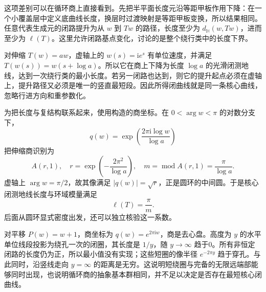 这项差别可以在循环商上直接看到。先把半平面长度元沿等距甲板作用下降：在一个小覆盖层中定义底曲线长度，换层时过渡映射是等距甲板变换，所以结果相同。任意代表生成元的闭路提升为从 \(w\) 到 \(Tw\) 的路径，长度至少为 \(d_{\mathbb H}(w,Tw)\)，进而至少为 \(\ell(T)\)。这里允许闭路基点变化，讨论的是整个绕行类中的长度下界。

\ProseParagraphBreak
对伸缩 \(T(w)=aw\)，虚轴上的 \(w(s)=\mathrm i e^s\) 有单位速度，并满足 \(T(w(s))=w(s+\log a)\)。所以它在商上下降为长度 \(\log a\) 的光滑闭测地线，达到一次绕行类的最小长度。若另一闭路也达到，则它的提升起点必须在虚轴上，提升路径又必须是唯一的竖直最短段。因此所得闭曲线就是同一条核心曲线，忽略行进方向和重参数化。

\ProseParagraphBreak
为把长度与复结构联系起来，使用构造的商坐标。在 \(0<\arg w<\pi\) 的对数分支下，
\[
 q(w)=\exp\left(\frac{2\pi\mathrm i\log w}{\log a}\right)
\]
把伸缩商识别为
\[
 A(r,1),\quad
 r=\exp\left(-\frac{2\pi^2}{\log a}\right),\quad
 m=\operatorname{mod}A(r,1)=\frac{\pi}{\log a}.
\]
虚轴上 \(\arg w=\pi/2\)，故其像满足 \(|q(w)|=\sqrt r\)，正是圆环的中间圆。于是核心闭测地线长度与环域模量满足
\[
 \ell(T)=\frac{\pi}{m}.
\]
后面从圆环显式密度出发，还可以独立核验这一系数。

\ProseParagraphBreak
对平移 \(P(w)=w+1\)，商坐标为 \(q(w)=e^{2\pi\mathrm iw}\)，商是去心盘。高度为 \(y\) 的水平单位线段投影为绕孔一次的闭圈，其长度是 \(1/y\)，随 \(y\to\infty\) 趋于0。所有非恒定闭路的长度仍为正，所以最小值没有实现；这些短圈的像半径 \(e^{-2\pi y}\) 趋于穿孔。与此同时，沿竖线走向 \(y=\infty\) 的距离是无穷。这说明短绕圈与完备的无限远端部能够同时出现，也说明循环商的抽象基本群相同，并不足以决定是否存在最短核心闭曲线。

